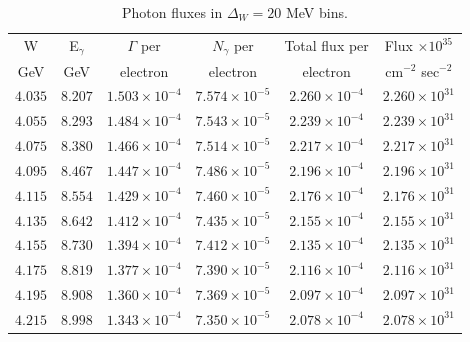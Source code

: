 \documentclass[12pt]{revtex4}
\begin{document}
\begin{table}[htdp]
\caption{Photon fluxes in $\Delta_W=20$ MeV bins.}
\begin{center}
\begin{tabular}{|c|c|c|c|c|c|}
\hline
 W &  E$_\gamma$&$\Gamma$ per &$N_\gamma$ per &Total flux per &  Flux $\times 10^{35}$ \\ 
 GeV &GeV&electron&electron&electron& cm$^{-2}$ sec$^{-2}$ \\ \hline

$4.035$ &   $8.207$ & $1.503\times 10^{-4}$ & $7.574\times 10^{-5}$ & $2.260\times 10^{-4}$ & $2.260\times 10^{31}$ \\ \hline
$4.055$ &   $8.293$ & $1.484\times 10^{-4}$ & $7.543\times 10^{-5}$ & $2.239\times 10^{-4}$ & $2.239\times 10^{31}$ \\ \hline
$4.075$ &   $8.380$ & $1.466\times 10^{-4}$ & $7.514\times 10^{-5}$ & $2.217\times 10^{-4}$ & $2.217\times 10^{31}$ \\ \hline
$4.095$ &   $8.467$ & $1.447\times 10^{-4}$ & $7.486\times 10^{-5}$ & $2.196\times 10^{-4}$ & $2.196\times 10^{31}$ \\ \hline
$4.115$ &   $8.554$ & $1.429\times 10^{-4}$ & $7.460\times 10^{-5}$ & $2.176\times 10^{-4}$ & $2.176\times 10^{31}$ \\ \hline
$4.135$ &   $8.642$ & $1.412\times 10^{-4}$ & $7.435\times 10^{-5}$ & $2.155\times 10^{-4}$ & $2.155\times 10^{31}$ \\ \hline
$4.155$ &   $8.730$ & $1.394\times 10^{-4}$ & $7.412\times 10^{-5}$ & $2.135\times 10^{-4}$ & $2.135\times 10^{31}$ \\ \hline
$4.175$ &   $8.819$ & $1.377\times 10^{-4}$ & $7.390\times 10^{-5}$ & $2.116\times 10^{-4}$ & $2.116\times 10^{31}$ \\ \hline
$4.195$ &   $8.908$ & $1.360\times 10^{-4}$ & $7.369\times 10^{-5}$ & $2.097\times 10^{-4}$ & $2.097\times 10^{31}$\\ \hline
$4.215$ &   $8.998$ & $1.343\times 10^{-4}$ & $7.350\times 10^{-5}$ & $2.078\times 10^{-4}$ & $2.078\times 10^{31}$\\ \hline
\end{tabular}
\end{center}
\label{tab:flux1}
\end{table}%
\end{document}
